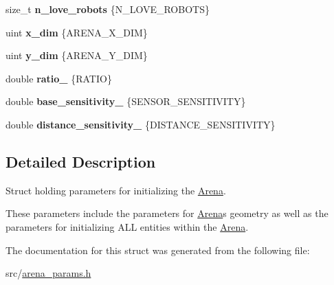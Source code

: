 \begin{DoxyCompactItemize}
\item 
size\+\_\+t {\bfseries n\+\_\+love\+\_\+robots} \{N\+\_\+\+L\+O\+V\+E\+\_\+\+R\+O\+B\+O\+TS\}\hypertarget{structarena__params_a268cd03bd929a94ff12c9081793deb53}{}\label{structarena__params_a268cd03bd929a94ff12c9081793deb53}

\item 
uint {\bfseries x\+\_\+dim} \{A\+R\+E\+N\+A\+\_\+\+X\+\_\+\+D\+IM\}\hypertarget{structarena__params_afa86b434ed8ea5a4fe9ae14ae1438e8f}{}\label{structarena__params_afa86b434ed8ea5a4fe9ae14ae1438e8f}

\item 
uint {\bfseries y\+\_\+dim} \{A\+R\+E\+N\+A\+\_\+\+Y\+\_\+\+D\+IM\}\hypertarget{structarena__params_ab5d50b9affa9c753c15e1d6f088824af}{}\label{structarena__params_ab5d50b9affa9c753c15e1d6f088824af}

\item 
double {\bfseries ratio\+\_\+} \{R\+A\+T\+IO\}\hypertarget{structarena__params_a7036779716509a6f5a9fcc054869cfb9}{}\label{structarena__params_a7036779716509a6f5a9fcc054869cfb9}

\item 
double {\bfseries base\+\_\+sensitivity\+\_\+} \{S\+E\+N\+S\+O\+R\+\_\+\+S\+E\+N\+S\+I\+T\+I\+V\+I\+TY\}\hypertarget{structarena__params_a50ef4e7e4511f15387b19bc208b1ff38}{}\label{structarena__params_a50ef4e7e4511f15387b19bc208b1ff38}

\item 
double {\bfseries distance\+\_\+sensitivity\+\_\+} \{D\+I\+S\+T\+A\+N\+C\+E\+\_\+\+S\+E\+N\+S\+I\+T\+I\+V\+I\+TY\}\hypertarget{structarena__params_a42a767ffd66befac0b3cfcb1485afc2f}{}\label{structarena__params_a42a767ffd66befac0b3cfcb1485afc2f}

\end{DoxyCompactItemize}


\subsection{Detailed Description}
Struct holding parameters for initializing the \hyperlink{classArena}{Arena}. 

These parameters include the parameters for \hyperlink{classArena}{Arena}\textquotesingle{}s geometry as well as the parameters for initializing A\+LL entities within the \hyperlink{classArena}{Arena}. 

The documentation for this struct was generated from the following file\+:\begin{DoxyCompactItemize}
\item 
src/\hyperlink{arena__params_8h}{arena\+\_\+params.\+h}\end{DoxyCompactItemize}
